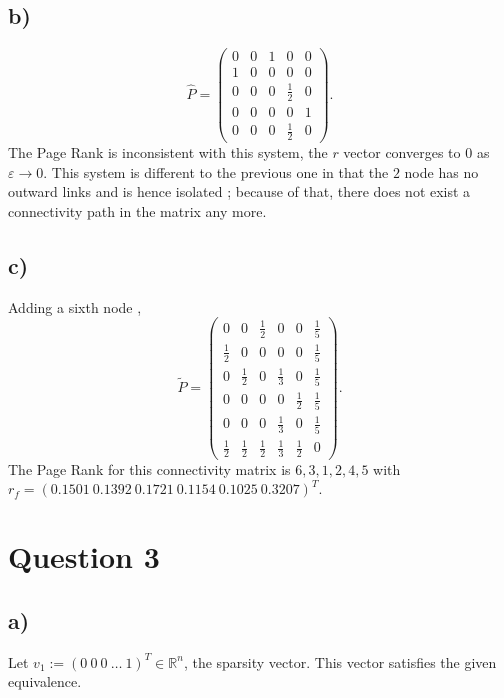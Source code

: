 \documentclass[12pt]{article}
\theoremstyle{definition}
\theoremstyle{definition}
\theoremstyle{definition}
\theoremstyle{definition}
\theoremstyle{definition}
\theoremstyle{example}
\theoremstyle{note}
\theoremstyle{remark}
\theoremstyle{example}
\begin{document}
			\subsection*{b) }
				\begin{equation}
					\hat{P} = \begin{pmatrix}
					0 & 0 & 1 & 0 & 0 \\
					1 & 0 & 0 & 0 & 0 \\
					0 & 0 & 0 & \frac12 & 0 \\
					0 & 0 & 0 & 0 & 1 \\
					0 & 0 & 0 & \frac12 & 0 
					\end{pmatrix}.
				\end{equation}
				The Page Rank is inconsistent with this system, the $r$ vector converges to $0$ as $\varepsilon \to 0$. This system is different to the previous one in that the $2$ node has no outward links and is hence isolated ; because of that, there does not exist a connectivity path in the matrix any more. 
			
			\subsection*{c) }
				Adding a sixth node ,
				\begin{equation}
					\widetilde{P} = \begin{pmatrix}
					0 & 0 & \frac12 & 0 & 0 & \frac15 \\
					\frac12 & 0 & 0 & 0 & 0 & \frac15\\
					0 & \frac12 & 0 & \frac13 & 0 & \frac15\\
					0 & 0 & 0 & 0 & \frac12& \frac15 \\
					0 & 0 & 0 & \frac13 & 0 & \frac15\\
					\frac12 & \frac12 & \frac12 & \frac13 & \frac12 & 0
					\end{pmatrix}. 
				\end{equation}
				The Page Rank for this connectivity matrix is $6,3,1,2,4,5$ with \\ $r_{f} = (0.1501 \ 0.1392 \ 0.1721 \ 0.1154 \ 0.1025 \ 0.3207)^{T}.$
		\section*{Question 3} 
			\subsection*{a) }
				Let $v_{1} := (0 \ 0 \ 0 \ \dots \ 1)^{T} \in \mathbb{R}^{n}$, the sparsity vector. This vector satisfies the given equivalence. 
\end{document}
